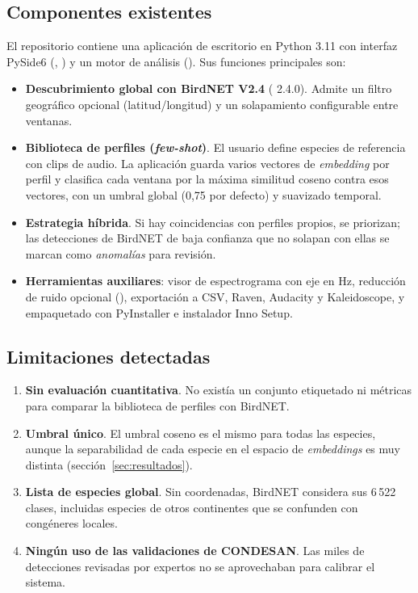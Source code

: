 \documentclass[11pt,a4paper]{article}
\begin{document}
\subsection{Componentes existentes}
El repositorio contiene una aplicación de escritorio en Python 3.11 con interfaz PySide6 (, ) y un
motor de análisis (). Sus funciones principales son:
\begin{itemize}
  \item \textbf{Descubrimiento global con BirdNET V2.4} ( 2.4.0). Admite un filtro geográfico opcional
        (latitud/longitud) y un solapamiento configurable entre ventanas.
  \item \textbf{Biblioteca de perfiles (\emph{few-shot})}. El usuario define especies de referencia con clips de audio.
        La aplicación guarda varios vectores de \emph{embedding} por perfil y clasifica cada ventana por la máxima
        similitud coseno contra esos vectores, con un umbral global (0,75 por defecto) y suavizado temporal.
  \item \textbf{Estrategia híbrida}. Si hay coincidencias con perfiles propios, se priorizan; las detecciones de BirdNET de
        baja confianza que no solapan con ellas se marcan como \emph{anomalías} para revisión.
  \item \textbf{Herramientas auxiliares}: visor de espectrograma con eje en Hz, reducción de ruido opcional (),
        exportación a CSV, Raven, Audacity y Kaleidoscope, y empaquetado con PyInstaller e instalador Inno Setup.
\end{itemize}

\subsection{Limitaciones detectadas}
\begin{enumerate}
  \item \textbf{Sin evaluación cuantitativa}. No existía un conjunto etiquetado ni métricas para comparar la biblioteca de perfiles con BirdNET.
  \item \textbf{Umbral único}. El umbral coseno es el mismo para todas las especies, aunque la separabilidad de cada especie en el espacio de \emph{embeddings} es muy distinta (sección~\ref{sec:resultados}).
  \item \textbf{Lista de especies global}. Sin coordenadas, BirdNET considera sus 6\,522 clases, incluidas especies de otros continentes que se confunden con congéneres locales.
  \item \textbf{Ningún uso de las validaciones de CONDESAN}. Las miles de detecciones revisadas por expertos no se aprovechaban para calibrar el sistema.
\end{enumerate}
\end{document}
